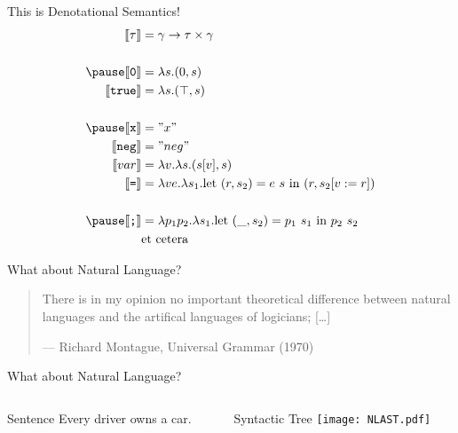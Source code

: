 \documentclass{beamer}
\newcommand{\sem}[1]{\llbracket #1 \rrbracket}
\begin{document}
\begin{frame}{This is Denotational Semantics!}
   \begin{align*}
    \sem{\tau} &= \gamma \to \tau \times \gamma \\
    \\ \pause
    \sem{\texttt{0}} &= \lambda s. (0, s)  \\
    \sem{\texttt{true}} &= \lambda s. (\top, s) \\
    \\ \pause
    \sem{\texttt{x}} &= "x" \\
    \sem{\texttt{neg}} &= "neg" \\
    \sem{var} &= \lambda v. \lambda s. (s[v], s) \\
    \sem{\texttt{=}} &= \lambda v e. \lambda s_1. \text{let}\ (r, s_2) = e\ s\ \text{in}\ (r, s_2[v := r]) \\
    \\ \pause
    \sem{\texttt{;}} &= \lambda p_1 p_2. \lambda s_1. \text{let}\ (\_, s_2)
    = p_1\ s_1\ \text{in}\ p_2\ s_2 \\
    & \text{et cetera}
  \end{align*}
\end{frame}

\begin{frame}{What about Natural Language?}
   \begin{center}
    \begin{quotation}
      There is in my opinion no important theoretical difference between
      natural languages and the artifical languages of logicians; [\ldots]

      \raggedleft--- \textup{Richard Montague}, Universal Grammar (1970)
    \end{quotation}
  \end{center}
\end{frame}

\begin{frame}{What about Natural Language?}
  \begin{columns}
    \begin{column}{0.5\textwidth}
    \begin{block}{Sentence}
      Every driver owns a car.
    \end{block}
    \end{column}
    \begin{column}{0.5\textwidth}
      \begin{block}{Syntactic Tree}
      \texttt{[image: NLAST.pdf]}
      \end{block}
    \end{column}
  \end{columns}
\end{frame}
\end{document}

